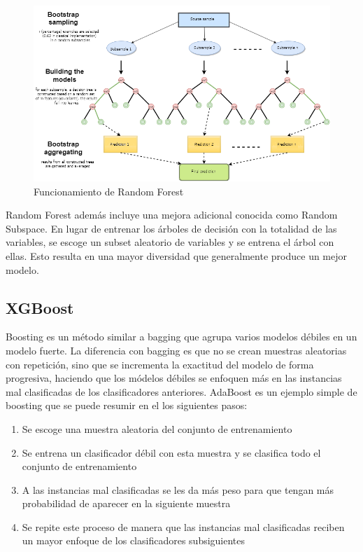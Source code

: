 \begin{figure}
    \centering
    \caption{Funcionamiento de Random Forest}
    \label{fig:rf}
    \includegraphics[width=\linewidth]{graficos/rf.png}
\end{figure}

Random Forest además incluye una mejora adicional conocida como Random Subspace. En lugar de entrenar los árboles de decisión con la totalidad de las variables, se escoge un subset aleatorio de variables y se entrena el árbol con ellas. Esto resulta en una mayor diversidad que generalmente produce un mejor modelo.

\subsection{XGBoost}

Boosting es un método similar a bagging que agrupa varios modelos débiles en un modelo fuerte. La diferencia con bagging es que no se crean muestras aleatorias con repetición, sino que se incrementa la exactitud del modelo de forma progresiva, haciendo que los módelos débiles se enfoquen más en las instancias mal clasificadas de los clasificadores anteriores. AdaBoost es un ejemplo simple de boosting que se puede resumir en el los siguientes pasos:

\begin{enumerate}
    \item Se escoge una muestra aleatoria del conjunto de entrenamiento
    \item Se entrena un clasificador débil con esta muestra y se clasifica todo el conjunto de entrenamiento
    \item A las instancias mal clasificadas se les da más peso para que tengan más probabilidad de aparecer en la siguiente muestra
    \item Se repite este proceso de manera que las instancias mal clasificadas reciben un mayor enfoque de los clasificadores subsiguientes
\end{enumerate}

